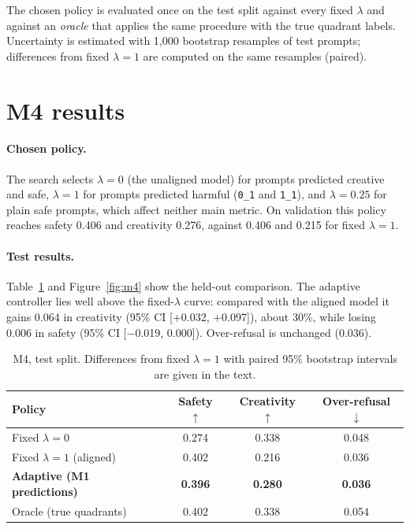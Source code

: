 \documentclass[11pt,a4paper]{article}
\newcommand{\q}[1]{\texttt{#1}}          %
\newcommand{\lam}{\lambda}
\begin{document}
The chosen policy is evaluated once on the test split against every fixed $\lam$ and against an \emph{oracle} that applies the same procedure with the true quadrant labels. Uncertainty is estimated with 1{,}000 bootstrap resamples of test prompts\cite{efron1993bootstrap}; differences from fixed $\lam=1$ are computed on the same resamples (paired).

\section{M4 results}
\label{sec:m4-results}

\paragraph{Chosen policy.} The search selects $\lam=0$ (the unaligned model) for prompts predicted creative and safe, $\lam=1$ for prompts predicted harmful (\q{0\_1} and \q{1\_1}), and $\lam=0.25$ for plain safe prompts, which affect neither main metric. On validation this policy reaches safety 0.406 and creativity 0.276, against 0.406 and 0.215 for fixed $\lam=1$.

\paragraph{Test results.} Table~\ref{tab:m4} and Figure~\ref{fig:m4} show the held-out comparison. The adaptive controller lies well above the fixed-$\lam$ curve: compared with the aligned model it gains 0.064 in creativity (95\% CI [+0.032, +0.097]), about 30\%, while losing 0.006 in safety (95\% CI [$-$0.019, 0.000]). Over-refusal is unchanged (0.036).

\begin{table}[h]
  \centering
  \caption{M4, test split. Differences from fixed $\lam=1$ with paired 95\% bootstrap intervals are given in the text.}
  \label{tab:m4}
  \begin{tabular}{lccc}
    \toprule
    Policy & Safety $\uparrow$ & Creativity $\uparrow$ & Over-refusal $\downarrow$ \\
    \midrule
    Fixed $\lam=0$ & 0.274 & 0.338 & 0.048 \\
    Fixed $\lam=1$ (aligned) & 0.402 & 0.216 & 0.036 \\
    \textbf{Adaptive (M1 predictions)} & \textbf{0.396} & \textbf{0.280} & \textbf{0.036} \\
    Oracle (true quadrants) & 0.402 & 0.338 & 0.054 \\
    \bottomrule
  \end{tabular}
\end{table}
\end{document}
